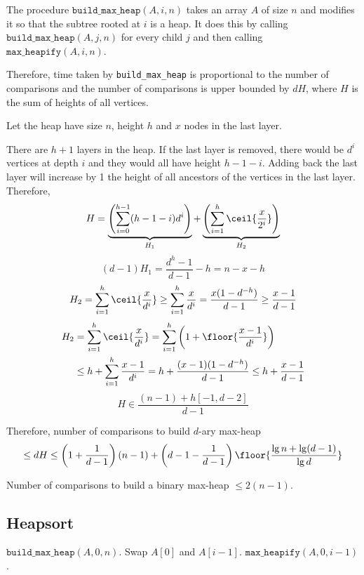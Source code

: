 The procedure $\texttt{build\_max\_heap}(A, i, n)$ takes an array $A$ of size $n$
and modifies it so that the subtree rooted at $i$ is a heap.
It does this by calling $\texttt{build\_max\_heap}(A, j, n)$ for every child $j$
and then calling $\texttt{max\_heapify}(A, i, n)$.

Therefore, time taken by \texttt{build\_max\_heap} is proportional to the number of comparisons
and the number of comparisons is upper bounded by $dH$, where $H$ is the sum of heights of all vertices.

Let the heap have size $n$, height $h$ and $x$ nodes in the last layer.

There are $h+1$ layers in the heap.
If the last layer is removed, there would be $d^i$ vertices at depth $i$
and they would all have height $h-1-i$.
Adding back the last layer will increase by 1 the height of all ancestors
of the vertices in the last layer. Therefore,
\[ H = \underbrace{\left( \sum_{i=0}^{h-1} (h-1-i)d^i \right)}_{H_1}
    + \underbrace{\left( \sum_{i=1}^h \ceil{\frac{x}{2^i}} \right)}_{H_2} \]
\[ (d-1)H_1 = \frac{d^h-1}{d-1} - h = n-x-h \]
\[ H_2 = \sum_{i=1}^h \ceil{\frac{x}{d^i}}
\ge \sum_{i=1}^h \frac{x}{d^i}
= \frac{x(1-d^{-h})}{d-1}
\ge \frac{x-1}{d-1} \]
\begin{align*}
H_2 &= \sum_{i=1}^h \ceil{\frac{x}{d^i}}
= \sum_{i=1}^h \left( 1 + \floor{\frac{x-1}{d^i}} \right)
\\ &\le h + \sum_{i=1}^h \frac{x-1}{d^i}
= h + \frac{(x-1)(1-d^{-h})}{d-1}
\le h + \frac{x-1}{d-1}
\end{align*}
\[ H \in \frac{(n-1) + h[-1, d-2]}{d-1} \]

Therefore, number of comparisons to build $d$-ary max-heap
\[ \le dH \le \left(1 + \frac{1}{d-1}\right)(n-1)
+ \left(d-1 - \frac{1}{d-1}\right)\floor{\frac{\lg n + \lg (d-1)}{\lg d}} \]

Number of comparisons to build a binary max-heap $\le 2(n-1)$.

\subsection{Heapsort}

\begin{algorithm}[H]
\caption{$\texttt{heapsort}(A, n)$}
\label{algo-heapsort}
\begin{algorithmic}
\State $\texttt{build\_max\_heap}(A, 0, n)$.
    \State Swap $A[0]$ and $A[i-1]$.
    \State $\texttt{max\_heapify}(A, 0, i-1)$.
\EndFor
\end{algorithmic}
\end{algorithm}

